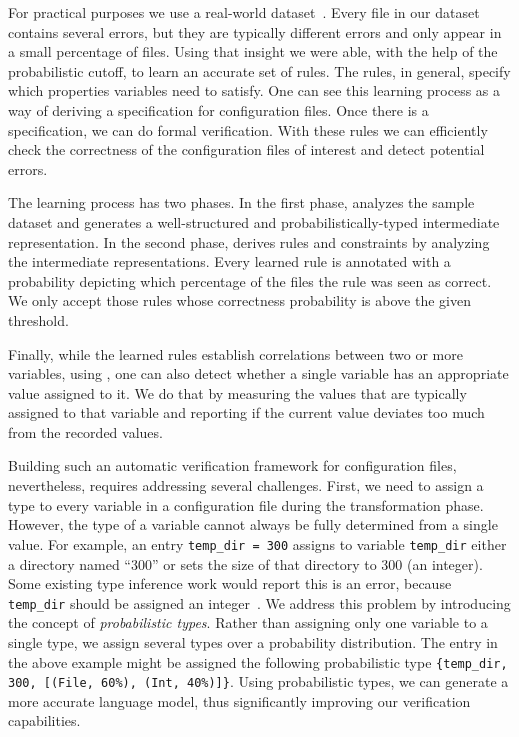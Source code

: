 For practical purposes we use a real-world dataset~\cite{configdataset}. 
Every file in our dataset contains several errors, 
but they are typically different errors and only appear 
in a small percentage of files. Using that insight we were able, with the help of the probabilistic cutoff, to learn an
accurate set of rules. The rules, in general, specify which properties variables need to satisfy. One can see this learning process as a
way of deriving  
a specification for configuration files.  Once there is a specification, we can do formal verification. With these 
rules we can efficiently check the correctness of the configuration files
of interest and detect potential errors.

The learning process has two phases. In the first phase, 
\app analyzes the sample dataset and generates a 
well-structured and probabilistically-typed 
intermediate representation. 
In the second phase, \app derives rules and constraints by analyzing
the intermediate representations.  Every learned rule is annotated with a probability 
depicting which percentage of the files the rule was seen as correct. We only accept those rules whose 
correctness probability is above the given threshold. 

Finally, while the learned rules establish correlations between two or more variables, using \app, one can also detect whether a
single variable has an appropriate value assigned to it. We do that by measuring the values that are typically assigned to that variable 
and reporting if the current value deviates too much from the recorded values.

Building such an automatic verification framework for
configuration files, nevertheless, requires addressing several challenges. 
First, we need to assign a type to every variable in a configuration file during the transformation phase.
However,
the type of a variable cannot always be fully determined 
from a single value. 
For example, an entry {\tt temp\_dir = 300} assigns to variable {\tt temp\_dir} either a directory named ``300'' or sets the size of that directory to 300 (an integer).
Some existing type inference 
work would report this is an error, because {\tt temp\_dir} should be assigned
an integer~\cite{zhang14encore}. We address this problem by introducing the concept of
{\emph{probabilistic types}}.
Rather than assigning only one variable to a single type, 
we assign several types over a probability distribution. 
The entry in the above example might be assigned 
the following probabilistic type
{\tt \{temp\_dir, 300, [(File, 60\%), (Int, 40\%)]\}}.
Using probabilistic types,
we can generate a more accurate language model,
thus significantly improving our verification capabilities.

